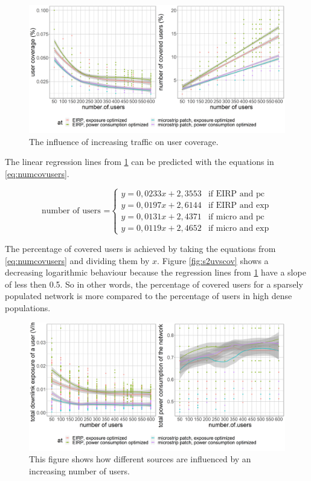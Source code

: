 \begin{figure}[h!]
  \includegraphics[width=\textwidth]{../results/s2/uvsnumdronesAndCov.png}
  \caption{The influence of increasing traffic on user coverage.}
  \label{fig:s2uvsnumcovusers}
\end{figure}

The linear regression lines from \ref{fig:s2uvsnumcovusers} can be predicted with the equations in \ref{eq:numcovusers}.

\begin{equation}
\text{number of users =}
    \begin{cases}
      y = 0,0233x + 2,3553 & \text{if EIRP and pc}\\
      y = 0,0197x + 2,6144  & \text{if EIRP and exp}\\
      y = 0,0131x + 2,4371  & \text{if micro and pc}\\
      y = 0,0119x + 2,4652  & \text{if micro and exp}
    \end{cases} 
    \label{eq:numcovusers}      
\end{equation}

The percentage of covered users is achieved by taking the equations from \ref{eq:numcovusers} and dividing them by $x$.
Figure \ref{fig:s2uvscov} shows a decreasing logarithmic behaviour because the regression lines from  \ref{fig:s2uvsnumcovusers} have a slope of less then 0.5.
So in other words, the  percentage of covered users for a sparsely populated network is more compared to the percentage of users in high dense populations.

\begin{figure}[h!]
  \includegraphics[width=\textwidth]{../results/s2/uvsdlAndPc.png}
  \caption{This figure shows how different sources are influenced by an increasing number of users. }
  \label{fig:s2uvssar}
\end{figure}

